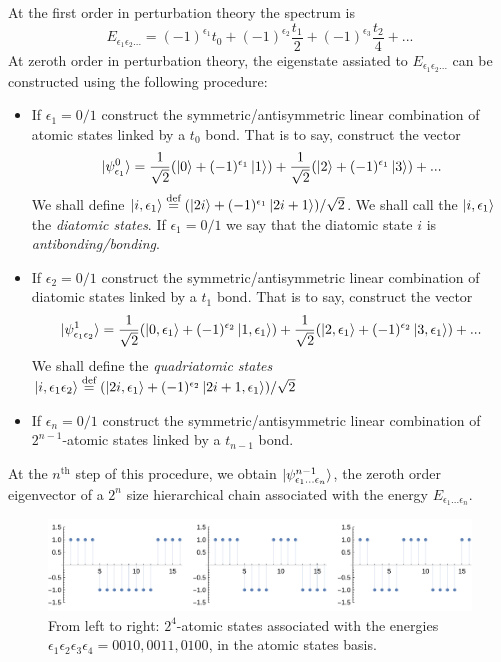 \documentclass[11pt]{article}
\newcommand{\define}{\ensuremath{ \overset{\text{def}}{=} }}
\begin{document}
At the first order in perturbation theory the spectrum is
\begin{equation}
	E_{\epsilon_1\epsilon_2...} = (-1)^{\epsilon_1} t_0 + (-1)^{\epsilon_2} \frac{t_1}{2} + (-1)^{\epsilon_3} \frac{t_2}{4} + ...
\end{equation} 
At zeroth order in perturbation theory, the eigenstate assiated to $E_{\epsilon_1\epsilon_2...}$ can be constructed using the following procedure:
\begin{itemize}
	\item If $\epsilon_1 = 0/1$ construct the symmetric/antisymmetric linear combination of atomic states linked by a $t_0$ bond. That is to say, construct the vector
	\begin{equation}
		\ket{\psi^0_{\epsilon_1}} = \frac{1}{\sqrt{2}} ( \ket{0} + (-1)^{\epsilon_1} \ket{1} ) + \frac{1}{\sqrt{2}} ( \ket{2} + (-1)^{\epsilon_1} \ket{3} ) + ...
	\end{equation}
	We shall define $\ket{i,\epsilon_1} \define ( \ket{2i} + (-1)^{\epsilon_1} \ket{2i+1} )/\sqrt{2} $. We shall call the $\ket{i,\epsilon_1}$ the \emph{diatomic states}. If $\epsilon_1=0/1$ we say that the diatomic state $i$ is \emph{antibonding/bonding}.
	
	\item If $\epsilon_2 = 0/1$ construct the symmetric/antisymmetric linear combination of diatomic states linked by a $t_1$ bond. That is to say, construct the vector
	\begin{equation}
		\ket{\psi^1_{\epsilon_1 \epsilon_2}} = \frac{1}{\sqrt{2}} ( \ket{0,\epsilon_1} + (-1)^{\epsilon_2} \ket{1,\epsilon_1} ) + \frac{1}{\sqrt{2}} ( \ket{2,\epsilon_1} + (-1)^{\epsilon_2} \ket{3,\epsilon_1} ) + ...
	\end{equation}
	We shall define the \emph{quadriatomic states} $\ket{i,\epsilon_1 \epsilon_2} \define ( \ket{2i,\epsilon_1} + (-1)^{\epsilon_2} \ket{2i+1,\epsilon_1} )/\sqrt{2} $
	\item If $\epsilon_n = 0/1$ construct the symmetric/antisymmetric linear combination of $2^{n-1}$-atomic states linked by a $t_{n-1}$ bond.
\end{itemize}
At the $n^\text{th}$ step of this procedure, we obtain $\ket{\psi^{n-1}_{\epsilon_1...\epsilon_n}}$, the zeroth order eigenvector of a $2^n$ size hierarchical chain associated with the energy $E_{\epsilon_1...\epsilon_n}$.

\begin{figure}[htp]
\centering
  \includegraphics[width=.9\linewidth]{data/eigenfunctions_zeroth_order.pdf}
  \caption{From left to right: $2^4$-atomic states associated with the energies $\epsilon_1\epsilon_2\epsilon_3\epsilon_4 = 0010, 0011, 0100$, in the atomic states basis.}
  \label{fig:eigenfunctions_strong_hierarchy}
\end{figure}
\end{document}
